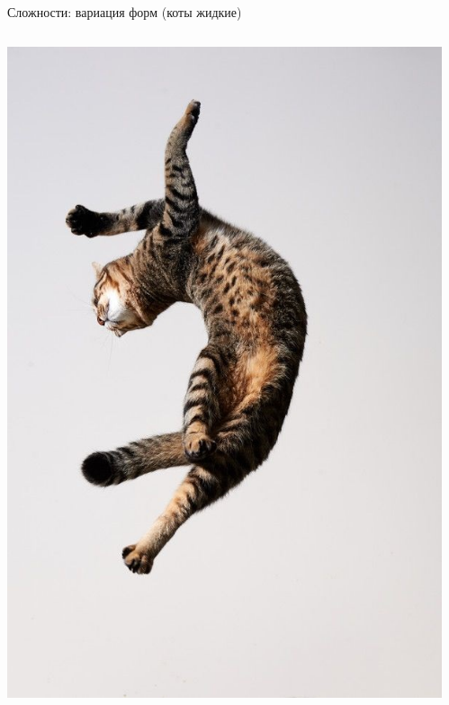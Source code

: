 \documentclass[aspectratio=169, professionalfonts]{beamer}
\begin{document}
\begin{frame}{Сложности: вариация форм (коты жидкие)}
\begin{columns}
\begin{column}{.325\linewidth}
            \includegraphics[width=\linewidth]{graphs/fig13_2.jpg}
        \end{column}
        \begin{column}{.325\linewidth}
            \centering

\end{column}
\end{columns}
\end{frame}
\end{document}
